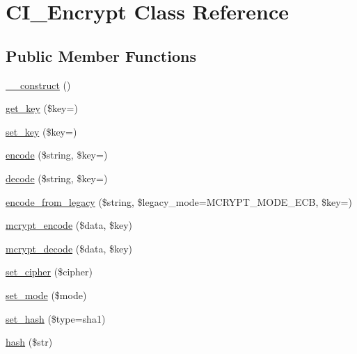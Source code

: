 \hypertarget{class_c_i___encrypt}{}\section{C\+I\+\_\+\+Encrypt Class Reference}
\label{class_c_i___encrypt}
\subsection*{Public Member Functions}
\begin{DoxyCompactItemize}
\item 
\mbox{\hyperlink{class_c_i___encrypt_a095c5d389db211932136b53f25f39685}{\+\_\+\+\_\+construct}} ()
\item 
\mbox{\hyperlink{class_c_i___encrypt_a5ee53ce94c80d9259dee76cefdd2e948}{get\+\_\+key}} (\$key=\textquotesingle{}\textquotesingle{})
\item 
\mbox{\hyperlink{class_c_i___encrypt_ac8f224ccad805d0bcdf4ab7722058ae2}{set\+\_\+key}} (\$key=\textquotesingle{}\textquotesingle{})
\item 
\mbox{\hyperlink{class_c_i___encrypt_a6320fc999db614bc009690cc4867e238}{encode}} (\$string, \$key=\textquotesingle{}\textquotesingle{})
\item 
\mbox{\hyperlink{class_c_i___encrypt_a54562258204ebec3d699eed228c51199}{decode}} (\$string, \$key=\textquotesingle{}\textquotesingle{})
\item 
\mbox{\hyperlink{class_c_i___encrypt_a74e58407a40ff1f3d030a2065cf10182}{encode\+\_\+from\+\_\+legacy}} (\$string, \$legacy\+\_\+mode=M\+C\+R\+Y\+P\+T\+\_\+\+M\+O\+D\+E\+\_\+\+E\+CB, \$key=\textquotesingle{}\textquotesingle{})
\item 
\mbox{\hyperlink{class_c_i___encrypt_aa1d7e40f65deb526fe4619da65c6b1ec}{mcrypt\+\_\+encode}} (\$data, \$key)
\item 
\mbox{\hyperlink{class_c_i___encrypt_a85f02c928abbbc5a6bf038ea5292324d}{mcrypt\+\_\+decode}} (\$data, \$key)
\item 
\mbox{\hyperlink{class_c_i___encrypt_a6459059d757a362410feb13d96455747}{set\+\_\+cipher}} (\$cipher)
\item 
\mbox{\hyperlink{class_c_i___encrypt_ab32fd90a4ac2df4be1e56460d6f6daa3}{set\+\_\+mode}} (\$mode)
\item 
\mbox{\hyperlink{class_c_i___encrypt_aa7cef093f6581d1dbeecdf815c7fd8b2}{set\+\_\+hash}} (\$type=\textquotesingle{}sha1\textquotesingle{})
\item 
\mbox{\hyperlink{class_c_i___encrypt_aea8db0058c00fd2bc1351ddb2ebf3191}{hash}} (\$str)
\end{DoxyCompactItemize}
